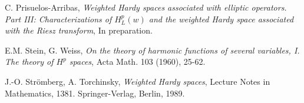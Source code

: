 \documentclass[11pt, a4paper,leqno]{amsart}
\theoremstyle{plain}
\theoremstyle{definition}
\theoremstyle{remark}
\numberwithin{equation}{section}
\begin{document}
\begin{thebibliography}{10}
 C. Prisuelos-Arribas, {\em Weighted Hardy spaces associated with elliptic operators. Part III: Characterizations
of $H^p_L(w)$ and the weighted Hardy space associated with the Riesz transform},  In preparation.



 E.M. Stein, G. Weiss, {\em On the theory of harmonic functions of several variables, I. The
theory of $H^p$ spaces}, Acta Math. 103 (1960), 25-62.


  J.-O. Str\"omberg, A. Torchinsky, {\em Weighted Hardy spaces}, Lecture Notes in Mathematics, 1381. Springer-Verlag, Berlin, 1989. 

\end{thebibliography}
\end{document}
